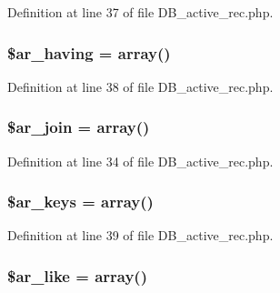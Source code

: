 Definition at line 37 of file D\-B\-\_\-active\-\_\-rec.\-php.

\hypertarget{class_c_i___d_b__active__record_a7d7dbdaa94e66d6e18088da8c614644d}{
\subsubsection[{\$ar\-\_\-having}]{\setlength{\rightskip}{0pt plus 5cm}\$ar\-\_\-having = array()}}\label{class_c_i___d_b__active__record_a7d7dbdaa94e66d6e18088da8c614644d}


Definition at line 38 of file D\-B\-\_\-active\-\_\-rec.\-php.

\hypertarget{class_c_i___d_b__active__record_a7586606381cc112cad3f31aabbc31ea6}{
\subsubsection[{\$ar\-\_\-join}]{\setlength{\rightskip}{0pt plus 5cm}\$ar\-\_\-join = array()}}\label{class_c_i___d_b__active__record_a7586606381cc112cad3f31aabbc31ea6}


Definition at line 34 of file D\-B\-\_\-active\-\_\-rec.\-php.

\hypertarget{class_c_i___d_b__active__record_aebf004d80ee72abc06da59389da36c45}{
\subsubsection[{\$ar\-\_\-keys}]{\setlength{\rightskip}{0pt plus 5cm}\$ar\-\_\-keys = array()}}\label{class_c_i___d_b__active__record_aebf004d80ee72abc06da59389da36c45}


Definition at line 39 of file D\-B\-\_\-active\-\_\-rec.\-php.

\hypertarget{class_c_i___d_b__active__record_a932080b6d718eb255adee55d0a05f815}{
\subsubsection[{\$ar\-\_\-like}]{\setlength{\rightskip}{0pt plus 5cm}\$ar\-\_\-like = array()}}\label{class_c_i___d_b__active__record_a932080b6d718eb255adee55d0a05f815}


